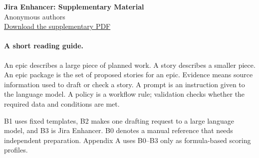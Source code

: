 \documentclass[10pt,a4paper]{article}
\begin{document}
\begin{center}
{\Large\bfseries Jira Enhancer: Supplementary Material}\\[0.7em]
Anonymous authors\\[0.7em]
\href{https://github.com/anonymous94u/JiraEnhancer/raw/refs/heads/main/supplementary/supplementary_material.pdf}{Download the supplementary PDF}
\end{center}
\paragraph{A short reading guide.}
An epic describes a large piece of planned work. A story describes a smaller piece. An epic package is the set of proposed stories for an epic. Evidence means source information used to draft or check a story. A prompt is an instruction given to the language model. A policy is a workflow rule; validation checks whether the required data and conditions are met.

B1 uses fixed templates, B2 makes one drafting request to a large language model, and B3 is Jira Enhancer. B0 denotes a manual reference that needs independent preparation. Appendix A uses B0--B3 only as formula-based scoring profiles.
\end{document}
